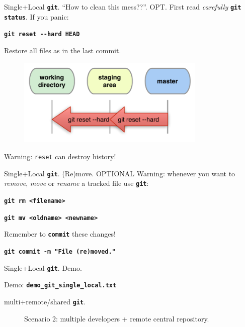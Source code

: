 \documentclass{beamer}
\newcommand{\git}{\texttt{\textbf{git}}\xspace}
\begin{document}
\begin{frame}{Single+Local \git. ``How to clean this mess??''. \alert{OPT.}}
  First read \emph{carefully} \texttt{\textbf{git status}}. If you panic:
  \begin{center}
    \texttt{\textbf{git reset -{}-hard HEAD}}
  \end{center}
  Restore all files as in the last commit.
  \begin{figure}
    \centering
    \includegraphics[width=9cm]{figs/local-reset-hard}
  \end{figure}
Warning: \alert{\texttt{reset} can destroy history!}
\end{frame}

\begin{frame}{Single+Local \git. (Re)move. \alert{OPTIONAL}}
  \alert{Warning}: whenever you want to \emph{remove}, \emph{move} or
  \emph{rename} a tracked file use \git:
  \begin{center}
    \texttt{\textbf{git rm <filename>}}
  \end{center}
  \begin{center}
    \texttt{\textbf{git mv <oldname> <newname>}}
  \end{center}
Remember to \texttt{\textbf{commit}} these changes!
  \begin{center}
    \texttt{\textbf{git commit -m "File (re)moved."}}
  \end{center}
\end{frame}


\begin{frame}{Single+Local \git. Demo.}
  \begin{center}
    Demo: \texttt{\textbf{demo\_git\_single\_local.txt}}
  \end{center}
\end{frame}


\begin{frame}{multi+remote/shared \git.}
  \begin{figure}
    \centering
    Scenario 2: multiple developers + remote central repository.
  \end{figure}
\end{frame}
\end{document}
